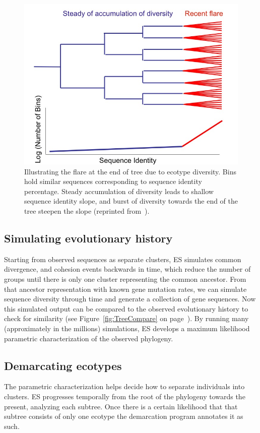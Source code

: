 \begin{figure}[h!]
\centering
\includegraphics[scale=0.45]{images/TreeFlare-CH2}
\caption[Illustrating the flare at the end of tree due to ecotype diversity.]{Illustrating the flare at the end of tree due to ecotype diversity. Bins hold similar sequences corresponding to sequence identity percentage. Steady accumulation of diversity leads to shallow sequence identity slope, and burst of diversity towards the end of the tree steepen the slope (reprinted from~\protect\cite{fredImage}).}
\label{fig:TreeFlare}
\end{figure}

\subsection*{Simulating evolutionary history}
Starting from observed sequences as separate clusters, ES simulates common divergence, and cohesion events backwards in time, which reduce the number of groups until there is only one cluster representing the common ancestor.
From that ancestor representation with known gene mutation rates, we can simulate sequence diversity through time and generate a collection of gene sequences.
Now this simulated output can be compared to the observed evolutionary history to check for similarity (see Figure~\ref{fig:TreeCompare} on page~\pageref{fig:TreeCompare}).
By running many (approximately in the millions) simulations, ES develops a maximum likelihood parametric characterization of the observed phylogeny. 

\subsection*{Demarcating ecotypes}
The parametric characterization helps decide how to separate individuals into clusters.
ES progresses temporally from the root of the phylogeny towards the present, analyzing each subtree.
Once there is a certain likelihood that that subtree consists of only one ecotype the demarcation program annotates it as such.



